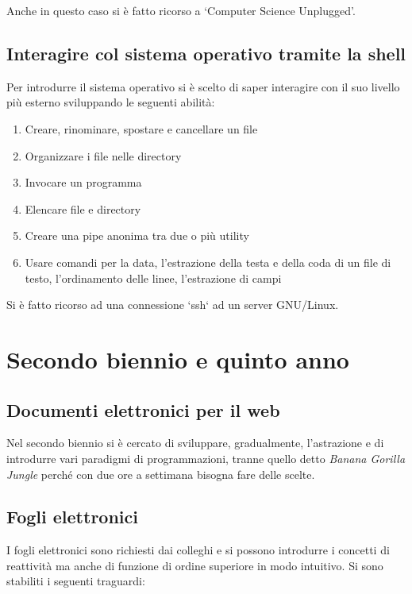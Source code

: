 \documentclass{easychair}
\begin{document}
Anche in questo caso si è fatto ricorso a `Computer Science Unplugged'.

\subsection[Sistemi Operativi]{Interagire col sistema operativo tramite la shell}

Per introdurre il sistema operativo si è scelto di saper interagire con il suo
livello più esterno sviluppando le seguenti abilità:

\begin{enumerate}
  \def\labelenumi{\arabic{enumi}.}
  \item
    Creare, rinominare, spostare e cancellare un file
  \item
    Organizzare i file nelle directory
  \item
    Invocare un programma
  \item
    Elencare file e directory
  \item
    Creare una pipe anonima tra due o più utility
  \item
    Usare comandi per la data, l'estrazione della testa e della coda
    di un file di testo, l'ordinamento delle linee, l'estrazione di campi
\end{enumerate}

Si è fatto ricorso ad una connessione `ssh` ad un server GNU/Linux.

\section{Secondo biennio e quinto anno}

\subsection[Web]{Documenti elettronici per il web}

Nel secondo biennio si è cercato di sviluppare, gradualmente, l'astrazione
e di introdurre vari paradigmi di programmazioni, tranne quello detto
\textit{Banana Gorilla Jungle} perché con due ore a settimana bisogna
fare delle scelte.
 
\subsection[Fogli elettronici]{Fogli elettronici}

I fogli elettronici sono richiesti dai colleghi e si possono
introdurre i concetti di reattività ma anche di funzione di
ordine superiore in modo intuitivo. Si sono stabiliti i seguenti
traguardi:
\end{document}

